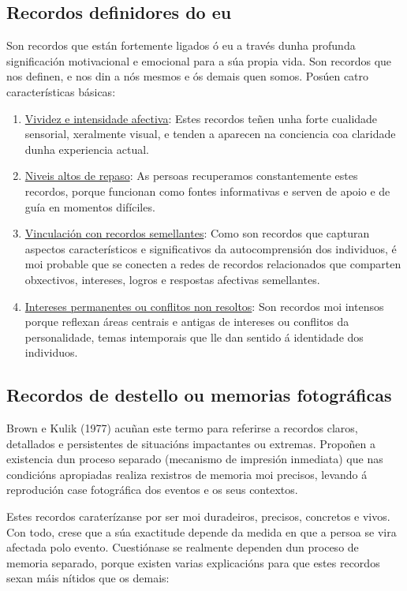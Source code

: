 \documentclass[a4paper,11pt]{article}
\begin{document}
\subsection{Recordos definidores do eu}
Son recordos que están fortemente ligados ó eu a través dunha profunda significación motivacional e emocional para a súa propia vida. Son recordos que nos definen, e nos din a nós mesmos e ós demais quen somos. Posúen catro características básicas:
\begin{enumerate}
	\item \underline{Vividez e intensidade afectiva}: Estes recordos teñen unha forte cualidade
	sensorial, xeralmente visual, e tenden a aparecen na conciencia coa claridade dunha experiencia
	actual.
	\item \underline{Niveis altos de repaso}: As persoas recuperamos constantemente estes recordos,
	porque funcionan como fontes informativas e serven de apoio e de guía en momentos difíciles.
	\item \underline{Vinculación con recordos semellantes}: Como son recordos que capturan aspectos 
	característicos e significativos da autocomprensión dos individuos, é moi probable que se
	conecten a redes de recordos relacionados que comparten obxectivos, intereses, logros e
	respostas afectivas semellantes.
	\item \underline{Intereses permanentes ou conflitos non resoltos}: Son recordos moi intensos
	porque reflexan áreas centrais e antigas de intereses ou conflitos da personalidade, temas
	intemporais que lle dan sentido á identidade dos individuos.
\end{enumerate}

\subsection{Recordos de destello ou memorias fotográficas}
Brown e Kulik (1977) acuñan este termo para referirse a recordos claros, detallados e persistentes de situacións impactantes ou extremas. Propoñen a existencia dun proceso separado (mecanismo de impresión inmediata) que nas condicións apropiadas realiza rexistros de memoria moi precisos, levando á reprodución case fotográfica dos eventos e os seus contextos.

Estes recordos caraterízanse por ser moi duradeiros, precisos, concretos e vivos. Con todo, crese que a súa exactitude depende da medida en que a persoa se vira afectada polo evento. Cuestiónase se realmente dependen dun proceso de memoria separado, porque existen varias explicacións para que estes recordos sexan máis nítidos que os demais:
\end{document}
